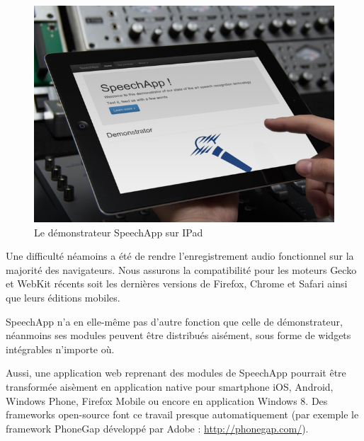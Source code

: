 \documentclass[a4paper,12pt]{report}
\begin{document}
\begin{figure}[H]
	\begin{center}
	\includegraphics[width=14cm]{pics/speechapp-ipad.png} 
	\end{center}
	\caption{Le démonstrateur SpeechApp sur IPad}
\end{figure}

Une difficulté néamoins a été de rendre l'enregistrement audio fonctionnel sur la majorité des navigateurs. Nous assurons la compatibilité pour les moteurs Gecko et WebKit récents soit les dernières versions de Firefox, Chrome et Safari ainsi que leurs éditions mobiles.

\bigskip{}

SpeechApp n'a en elle-même pas d'autre fonction que celle de démonstrateur, néanmoins ses modules peuvent être distribués aisément, sous forme de widgets intégrables n'importe où.

\medskip{}

Aussi, une application web reprenant des modules de SpeechApp pourrait être transformée aisèment en application native pour smartphone iOS, Android, Windows Phone, Firefox Mobile ou encore en application Windows 8. Des frameworks open-source font ce travail presque automatiquement (par exemple le framework PhoneGap développé par Adobe : \url{http://phonegap.com/}).
\end{document}
